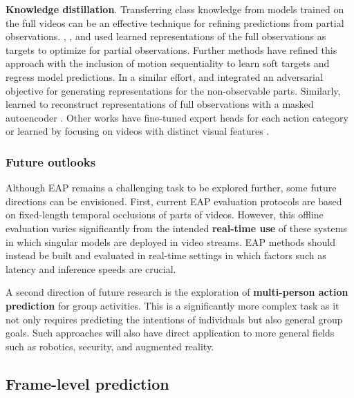 \noindent
\textbf{Knowledge distillation}. Transferring class knowledge  from models trained on the full videos can be an effective technique for refining predictions from partial observations. , , and  used learned representations of the full observations as targets to optimize for partial observations. Further methods  have refined this approach with the inclusion of motion sequentiality to learn soft targets and regress model predictions. In a similar effort,  and  integrated an adversarial objective for generating representations for the non-observable parts. Similarly,  learned to reconstruct representations of full observations with a masked autoencoder . Other works have fine-tuned expert heads for each action category  or learned by focusing on videos with distinct visual features .


\subsubsection{Future outlooks}
\label{sec:prediction::EAP:::outlooks}


Although EAP remains a challenging task to be explored further, some future directions can be envisioned. First, current EAP evaluation protocols are based on fixed-length temporal occlusions of parts of videos. However, this offline evaluation varies significantly from the intended \textbf{real-time use} of these systems in which singular models are deployed in video streams. EAP methods should instead be built and evaluated in real-time settings in which factors such as latency and inference speeds are crucial.

A second direction of future research is the exploration of \textbf{multi-person action prediction} for group activities. This is a significantly more complex task as it not only requires predicting the intentions of individuals but also general group goals. Such approaches will also have direct application to more general fields such as robotics, security, and augmented reality. 



\subsection{Frame-level prediction}
\label{sec:prediction::VFP}

